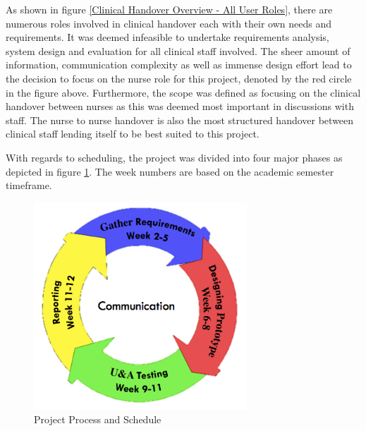 \noindent As shown in figure \ref{Clinical Handover Overview - All User Roles}, there are numerous roles involved in clinical handover each with their own needs and requirements. It was deemed infeasible to undertake requirements analysis, system design and evaluation for all clinical staff involved. The sheer amount of information, communication complexity as well as immense design effort lead to the decision to focus on the nurse role for this project, denoted by the red circle in the figure above. Furthermore, the scope was defined as focusing on the clinical handover between nurses as this was deemed most important in discussions with staff. The nurse to nurse handover is also the most structured handover between clinical staff lending itself to be best suited to this project. 

\newpage 
\noindent With regards to scheduling, the project was divided into four major phases as depicted in figure \ref{Project Process and Schedule}. The week numbers are based on the academic semester timeframe.

\begin{figure}[hp]
				\centering
				\includegraphics[scale=1.0, width=80mm]{Images/Project_Process}
				\caption{Project Process and Schedule}
				\label{Project Process and Schedule}
\end{figure} 

